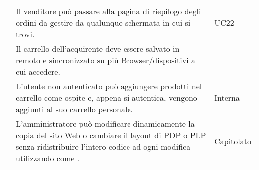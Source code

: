 \begin{longtable}{|c C{9.5cm} C{2.5cm}|}
     & Il venditore può passare alla pagina di riepilogo degli ordini da gestire da qualunque schermata in cui si trovi. & UC22 \\
    
     & Il carrello dell'acquirente deve essere salvato in remoto e sincronizzato su più Browser/dispositivi a cui accedere. &  \\
    
     & L'utente non autenticato può aggiungere prodotti nel carrello come ospite e, appena si autentica, vengono aggiunti al suo carrello personale. & Interna \\
    
     & L'amministratore può modificare dinamicamente la copia del sito Web o cambiare il layout di PDP o PLP senza ridistribuire l'intero codice ad ogni modifica utilizzando  come . & Capitolato \\

\end{longtable}

   
\begin{comment}
\rfun{O}{6} & La ricerca di prodotti deve essere possibile dalla schermata principale e dalla \glo{PLP}. & 
\end{comment}